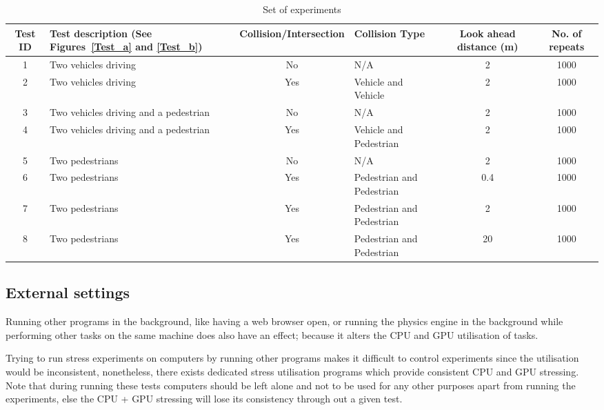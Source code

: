 \begin{table*}[b]
\centering
\begin{tabular}{clclcc}
\toprule
Test ID & Test description (See Figures~\ref{Test_a} and \ref{Test_b}) & Collision/Intersection & Collision Type & Look ahead distance (m) & No. of repeats \\ \midrule
1       & Two vehicles driving                   & No  & N/A & 2 & 1000 \\
2       & Two vehicles driving                   & Yes & Vehicle and Vehicle & 2 & 1000 \\
3       & Two vehicles driving and a pedestrian  & No  & N/A & 2 & 1000 \\
4       & Two vehicles driving and a pedestrian  & Yes & Vehicle and Pedestrian & 2 & 1000 \\
5       & Two pedestrians                        & No  & N/A & 2 & 1000 \\
6       & Two pedestrians                        & Yes & Pedestrian and Pedestrian & 0.4 & 1000 \\
7       & Two pedestrians                        & Yes & Pedestrian and Pedestrian & 2 & 1000 \\
8       & Two pedestrians                        & Yes & Pedestrian and Pedestrian & 20 & 1000 \\
\bottomrule
\end{tabular}
\caption{Set of experiments}
\label{TableOfExperiments}
\end{table*}

\subsection{External settings}
Running other programs in the background, like having a web browser open, or running the physics engine in the background while performing other tasks on the same machine does also have an effect; because it alters the CPU and GPU utilisation of tasks.

Trying to run stress experiments on computers by running other programs makes it difficult to control experiments since the utilisation would be inconsistent, nonetheless, there exists dedicated stress utilisation programs which provide consistent CPU and GPU stressing. Note that during running these tests computers should be left alone and not to be used for any other purposes apart from running the experiments, else the CPU + GPU stressing will lose its consistency through out a given test. 

